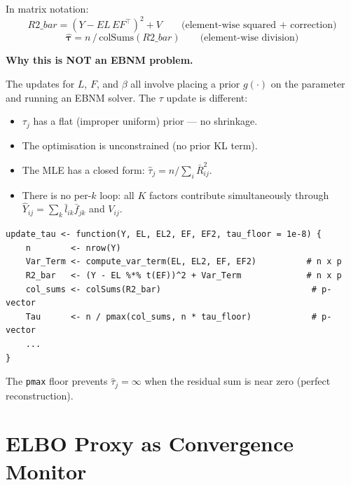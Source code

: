 \documentclass[11pt]{article}
\newcommand{\lbar}[2]{\bar{l}_{#1#2}}
\newcommand{\fbar}[2]{\bar{f}_{#1#2}}
\begin{document}
In matrix notation:
\begin{equation}
  R2\_bar = (Y - EL\,EF^\top)^2 + V
  \qquad\text{(element-wise squared + correction)}
  \label{eq:r2bar-matrix}
\end{equation}
\begin{equation}
  \hat{\bm{\tau}} = n\,/\,\mathrm{colSums}(R2\_bar)
  \qquad\text{(element-wise division)}
  \label{eq:tau-vector}
\end{equation}

\begin{notebox}
\textbf{Why this is NOT an EBNM problem.}

The updates for $L$, $F$, and $\beta$ all involve placing a prior $g(\cdot)$
on the parameter and running an EBNM solver.  The $\tau$ update is different:
\begin{itemize}
  \item $\tau_j$ has a flat (improper uniform) prior — no shrinkage.
  \item The optimisation is unconstrained (no prior KL term).
  \item The MLE has a closed form: $\hat{\tau}_j = n/\sum_i\bar{R}^2_{ij}$.
  \item There is no per-$k$ loop: all $K$ factors contribute simultaneously
    through $\hat{Y}_{ij} = \sum_k\lbar{i}{k}\fbar{j}{k}$ and $V_{ij}$.
\end{itemize}
\end{notebox}

\begin{codebox}
\begin{verbatim}
update_tau <- function(Y, EL, EL2, EF, EF2, tau_floor = 1e-8) {
    n        <- nrow(Y)
    Var_Term <- compute_var_term(EL, EL2, EF, EF2)          # n x p
    R2_bar   <- (Y - EL %*% t(EF))^2 + Var_Term             # n x p
    col_sums <- colSums(R2_bar)                              # p-vector
    Tau      <- n / pmax(col_sums, n * tau_floor)            # p-vector
    ...
}
\end{verbatim}
The \texttt{pmax} floor prevents $\hat{\tau}_j = \infty$ when the residual
sum is near zero (perfect reconstruction).
\end{codebox}

\section{ELBO Proxy as Convergence Monitor}\label{sec:elbo-proxy}
\end{document}
